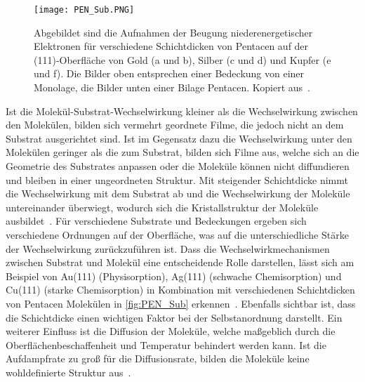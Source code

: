             \begin{figure}
                \centering
                \texttt{[image: PEN\_Sub.PNG]}
                \caption{Abgebildet sind die Aufnahmen der Beugung niederenergetischer Elektronen für verschiedene Schichtdicken von Pentacen auf der (111)-Oberfläche von Gold (a und b), Silber (c und d) und Kupfer (e und f).
                Die Bilder oben entsprechen einer Bedeckung von einer Monolage, die Bilder unten einer Bilage Pentacen.
                Kopiert aus~\cite{5A_4}.}
                \label{fig:PEN_Sub}
            \end{figure}
            Ist die Molekül-Substrat-Wechselwirkung kleiner als die Wechselwirkung zwischen den Molekülen, bilden sich vermehrt geordnete Filme, die jedoch nicht an dem Substrat ausgerichtet sind.
            Ist im Gegensatz dazu die Wechselwirkung unter den Molekülen geringer als die zum Substrat, bilden sich Filme aus, welche sich an die Geometrie des Substrates anpassen oder die Moleküle können nicht diffundieren und bleiben in einer ungeordneten Struktur.
            Mit steigender Schichtdicke nimmt die Wechselwirkung mit dem Substrat ab und die Wechselwirkung der Moleküle untereinander überwiegt, wodurch sich die Kristallstruktur der Moleküle ausbildet~\cite{5A_9}.
            Für verschiedene Substrate und Bedeckungen ergeben sich verschiedene Ordnungen auf der Oberfläche, was auf die unterschiedliche Stärke der Wechselwirkung zurückzuführen ist.
            Dass die Wechselwirkmechanismen zwischen Substrat und Molekül eine entscheidende Rolle darstellen, lässt sich am Beispiel von Au(111) (Physisorption),  Ag(111) (schwache Chemisorption) und Cu(111) (starke Chemisorption) in Kombination mit verschiedenen Schichtdicken von Pentacen Molekülen in \autoref{fig:PEN_Sub} erkennen~\cite{5A_4}.
            Ebenfalls sichtbar ist, dass die Schichtdicke einen wichtigen Faktor bei der Selbstanordnung darstellt.
            Ein weiterer Einfluss ist die Diffusion der Moleküle, welche maßgeblich durch die Oberflächenbeschaffenheit und Temperatur behindert werden kann.
            Ist die Aufdampfrate zu groß für die Diffusionsrate, bilden die Moleküle keine wohldefinierte Struktur aus~\cite{IF_15}.            

